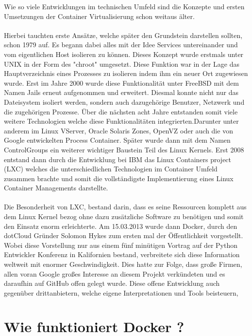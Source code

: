 \documentclass[12pt,toc=bib,toc=listof]{scrreprt}
\begin{document}
Wie so viele Entwicklungen im technischen Umfeld sind die Konzepte und ersten Umsetzungen der Container Virtualisierung schon weitaus älter.\\
\\
Hierbei tauchten erste Ansätze, welche später den Grundstein darstellen sollten, schon 1979 auf.
Es begann dabei alles mit der Idee Services untereinander und vom eigentlichen Host isolieren zu können.
Dieses Konzept wurde erstmals unter UNIX in der Form des "chroot" umgesetzt.
Diese Funktion war in der Lage das Hauptverzeichnis eines Prozesses zu isolieren indem ihm ein neuer Ort zugewiesen wurde. 
Erst im Jahre 2000 wurde diese Funktionalität unter FreeBSD mit dem Namen Jails erneut aufgenommen und erweitert.
Diesmal konnte nicht nur das Dateisystem isoliert werden, sondern auch dazugehörige Benutzer, Netzwerk und die zugehörigen Prozesse.
Über die nächsten acht Jahre entstanden somit viele weitere Technologien welche diese Funktionalitäten integrierten.Darunter unter anderem im
Linux VServer, Oracle Solaris Zones, OpenVZ oder auch die von Google entwickelten Process Container.
Später wurde dann mit dem Namen ControlGroups ein weiterer wichtiger Baustein Teil des Linux Kernels. 
Erst 2008 entstand dann durch die Entwicklung bei IBM  das Linux Containers project (LXC) welches die unterschiedlichen Technologien im Container Umfeld zusammen brachte und somit die vollständigste Implementierung eines Linux Container Managements darstellte.\\
\\
Die Besonderheit von LXC, bestand darin, dass es seine Ressourcen komplett aus dem Linux Kernel bezog ohne dazu zusätzliche Software zu benötigen und somit den Einsatz enorm erleichterte.
Am 15.03.2013 wurde dann Docker, durch den dotCloud Gründer Solomon Hykes zum ersten mal der Öffentlichkeit vorgestellt.
Wobei diese Vorstellung  nur aus einem fünf minütigen Vortrag auf der Python Entwickler Konferenz in Kalifornien bestand,
verbreitete sich diese Information weltweit mit enormer Geschwindigkeit.
Dies hatte zur Folge, dass große Firmen, allen voran Google großes Interesse an diesem Projekt verkündeten und es daraufhin auf GitHub offen gelegt wurde.
Diese offene Entwicklung auch gegenüber drittanbietern, welche eigene Interpretationen und Tools beisteuern, 


\section{Wie funktioniert Docker ?}
\end{document}

